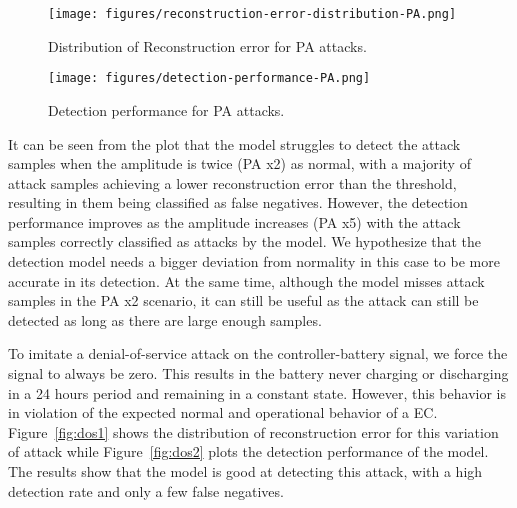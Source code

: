 \begin{figure}[htbp!] 
    \centering 
    \texttt{[image: figures/reconstruction-error-distribution-PA.png]}
    \caption{Distribution of Reconstruction error for PA attacks.}
    \centering
    \label{fig:PA1}
\end{figure}

\begin{figure}[htbp!] 
    \centering 
    \texttt{[image: figures/detection-performance-PA.png]}
    \caption{Detection performance for PA attacks.}
    \centering
    \label{fig:PA2}
\end{figure}

It can be seen from  the plot that the model struggles to detect the attack samples when the amplitude is twice (PA x2) as normal, with a majority of attack samples achieving a lower reconstruction error than the threshold, resulting in them being classified as false negatives. However, the detection performance improves as the amplitude increases (PA x5) with the attack samples correctly classified as attacks by the model. We hypothesize that the detection model needs a bigger deviation from normality in this case to be more accurate in its detection. At the same time, although the model misses attack samples in the PA x2 scenario, it can still be useful as the attack can still be detected as long as there are large enough samples.





\iffalse
\begin{figure}[htbp!] 
    \centering 
    \texttt{[image: figures/confusion\_matrix\_PAx2.png]}
    \caption{Confusion matrix PA x2}
    \centering
    \label{fig:PA3}
\end{figure}


\begin{figure}[htbp!] 
    \centering 
    \texttt{[image: figures/confusion\_matrix\_PAx5.png]}
    \caption{Confusion matrix PA x5}
    \centering
    \label{fig:PA4}
\end{figure}
\fi



To imitate a denial-of-service attack on the controller-battery signal, we force the signal to always be zero. This results in the battery never charging or discharging in a 24 hours period and remaining in a constant state. However, this behavior is in violation of the expected normal and operational behavior of a EC. Figure~\ref{fig:dos1} shows the distribution of reconstruction error for this variation of attack while Figure~\ref{fig:dos2} plots the detection performance of the model. The results show that the model is good at detecting this attack, with a high detection rate and only a few false negatives.

